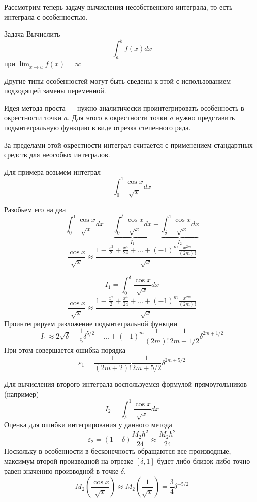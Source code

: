 \documentclass[professionalfonts,compress,unicode]{beamer}
\begin{document}
{
	Рассмотрим теперь задачу вычисления несобственного интеграла, то есть интеграла с особенностью.
	\pause
	\begin{block}{Задача}
		Вычислить
		$$
		\int_a^b f(x) dx
		$$
		при $\lim_{x \rightarrow a}f(x) = \infty$
	\end{block}
	\pause
	
	Другие типы особенностей могут быть сведены к этой с использованием подходящей замены переменной.
}

{
Идея метода %
проста --- нужно аналитически проинтегрировать особенность
в окрестности точки $a$. Для этого в окрестности точки $a$ нужно представить 
подынтегральную функцию в виде отрезка степенного ряда.

За пределами этой окрестности интеграл считается с применением стандартных средств для
неособых интегралов.
}

{
	Для примера возьмем интеграл
	$$
	\int_0^1 \frac{\cos x}{\sqrt{x}} dx
	$$
	\pause
	
	Разобьем его на два
	$$
	\int_0^1 \frac{\cos x}{\sqrt{x}} dx = \underbrace{\int_0^\delta \frac{\cos x}{\sqrt{x}} dx}_{I_1} + 
	\underbrace{\int_\delta^1 \frac{\cos x}{\sqrt{x}} dx}_{I_2}
	$$
	$$
	\frac{\cos x}{\sqrt{x}} \approx \frac{1 - \frac{x^2}{2} + \frac{x^4}{24} + \dots + (-1)^m\frac{x^{2m}}{(2m)!}}{\sqrt{x}}
	$$
}

{
	$$
	I_1 = \int_0^\delta \frac{\cos x}{\sqrt{x}} dx
	$$
	$$
	\frac{\cos x}{\sqrt{x}} \approx \frac{1 - \frac{x^2}{2} + \frac{x^4}{24} + \dots + (-1)^m\frac{x^{2m}}{(2m)!}}{\sqrt{x}}
	$$
	Проинтегрируем разложение подынтегральной функции
	$$
	I_1 \approx 2\sqrt{\delta} - \frac{1}{5}\delta^{5/2} + \dots + (-1)^m\frac{1}{(2m)!}\frac{1}{2m+1/2}\delta^{2m+1/2}
	$$
	При этом совершается ошибка порядка
	$$
	\varepsilon_1 = \frac{1}{(2m+2)!}\frac{1}{2m+5/2}\delta^{2m+5/2}
	$$
}

{
	Для вычисления второго интеграла воспользуемся формулой прямоугольников (например)
	$$
	I_2 = \int_\delta^1 \frac{\cos x}{\sqrt{x}} dx
	$$
	Оценка для ошибки интегрирования у данного метода
	$$
	\varepsilon_2 = (1-\delta)\frac{M_2 h^2}{24} \approx \frac{M_2 h^2}{24}
	$$
	Поскольку в особенности в бесконечность обращаются все производные, максимум 
	второй производной на отрезке $[\delta, 1]$ будет либо близок либо точно равен 
	значению производной в точке $\delta$.
	$$
	M_2\left(\frac{\cos x}{\sqrt{x}}\right) \approx M_2\left(\frac{1}{\sqrt{x}}\right) = \frac{3}{4}\delta^{-5/2}
	$$
}
\end{document}
